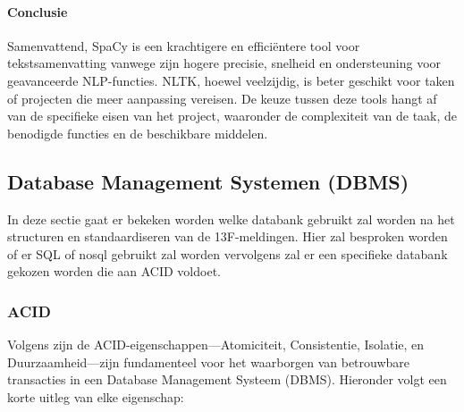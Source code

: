 \paragraph{Conclusie}
Samenvattend, SpaCy is een krachtigere en efficiëntere tool voor tekstsamenvatting vanwege zijn hogere precisie, snelheid en ondersteuning voor geavanceerde NLP-functies. NLTK, hoewel veelzijdig, is beter geschikt voor taken of projecten die meer aanpassing vereisen. De keuze tussen deze tools hangt af van de specifieke eisen van het project, waaronder de complexiteit van de taak, de benodigde functies en de beschikbare middelen.


\subsection{Database Management Systemen (DBMS)}
In deze sectie gaat er bekeken worden welke databank gebruikt zal worden na het structuren en standaardiseren van de 13F-meldingen. Hier zal besproken worden of er SQL of nosql gebruikt zal worden vervolgens zal er een specifieke databank gekozen worden die aan ACID voldoet.

\subsubsection{ACID}
Volgens \autocite{Kaur2024} zijn de ACID-eigenschappen—Atomiciteit, Consistentie, Isolatie, en Duurzaamheid—zijn fundamenteel voor het waarborgen van betrouwbare transacties in een Database Management Systeem (DBMS). Hieronder volgt een korte uitleg van elke eigenschap:

